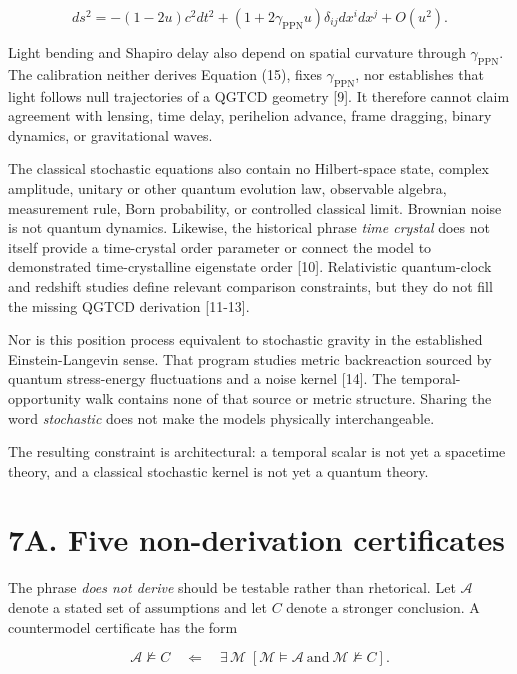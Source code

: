 \documentclass[
  american,
  11pt,
  letterpaper,
]{article}
\newcounter{none} %
\begin{document}
\begin{equation}
ds^2=-(1-2u)c^2dt^2
+(1+2\gamma_{\mathrm{PPN}}u)\delta_{ij}dx^idx^j+O(u^2).
\tag{15}
\end{equation}

Light bending and Shapiro delay also depend on spatial curvature through \(\gamma_{\mathrm{PPN}}\). The calibration neither derives Equation (15), fixes \(\gamma_{\mathrm{PPN}}\), nor establishes that light follows null trajectories of a QGTCD geometry {[}9{]}. It therefore cannot claim agreement with lensing, time delay, perihelion advance, frame dragging, binary dynamics, or gravitational waves.

The classical stochastic equations also contain no Hilbert-space state, complex amplitude, unitary or other quantum evolution law, observable algebra, measurement rule, Born probability, or controlled classical limit. Brownian noise is not quantum dynamics. Likewise, the historical phrase \emph{time crystal} does not itself provide a time-crystal order parameter or connect the model to demonstrated time-crystalline eigenstate order {[}10{]}. Relativistic quantum-clock and redshift studies define relevant comparison constraints, but they do not fill the missing QGTCD derivation {[}11-13{]}.

Nor is this position process equivalent to stochastic gravity in the established Einstein-Langevin sense. That program studies metric backreaction sourced by quantum stress-energy fluctuations and a noise kernel {[}14{]}. The temporal-opportunity walk contains none of that source or metric structure. Sharing the word \emph{stochastic} does not make the models physically interchangeable.

The resulting constraint is architectural: a temporal scalar is not yet a spacetime theory, and a classical stochastic kernel is not yet a quantum theory.

\section{7A. Five non-derivation certificates}\label{a.-five-non-derivation-certificates}

The phrase \emph{does not derive} should be testable rather than rhetorical. Let \(\mathcal A\) denote a stated set of assumptions and let \(C\) denote a stronger conclusion. A countermodel certificate has the form

\begin{equation}
\mathcal A\not\models C
\quad\Longleftarrow\quad
\exists\,\mathcal M\;[\mathcal M\models\mathcal A
\ \text{and}\ 
\mathcal M\not\models C].
\tag{16}
\end{equation}
\end{document}
